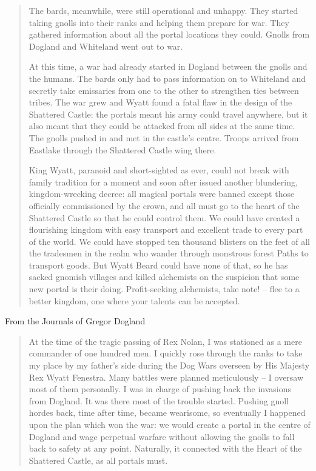 \begin{multicols}{2}
\begin{quotation}
	The bards, meanwhile, were still operational and unhappy.  They started taking gnolls into their ranks and helping them prepare for war.  They gathered information about all the portal locations they could.  Gnolls from Dogland and Whiteland went out to war.

	At this time, a war had already started in Dogland between the gnolls and the humans.  The bards only had to pass information on to Whiteland and secretly take emissaries from one to the other to strengthen ties between tribes.  The war grew and Wyatt found a fatal flaw in the design of the Shattered Castle: the portals meant his army could travel anywhere, but it also meant that they could be attacked from all sides at the same time.  The gnolls pushed in and met in the castle's centre.  Troops arrived from Eastlake through the Shattered Castle wing there.

	King Wyatt, paranoid and short-sighted as ever, could not break with family tradition for a moment and soon after issued another blundering, kingdom-wrecking decree: all magical portals were banned except those officially commissioned by the crown, and all must go to the heart of the Shattered Castle so that he could control them.  We could have created a flourishing kingdom with easy transport and excellent trade to every part of the world.  We could have stopped ten thousand blisters on the feet of all the tradesmen in the realm who wander through monstrous forest Paths to transport goods.  But Wyatt Beard could have none of that, so he has sacked gnomish villages and killed alchemists on the suspicion that some new portal is their doing.  Profit-seeking alchemists, take note! -- flee to a better kingdom, one where your talents can be accepted.

\end{quotation}

From the Journals of Gregor Dogland

\begin{quotation}

	At the time of the tragic passing of Rex Nolan, I was stationed as a mere commander of one hundred men.  I quickly rose through the ranks to take my place by my father's side during the Dog Wars overseen by His Majesty Rex Wyatt Fenestra.  Many battles were planned meticulously -- I oversaw most of them personally.  I was in charge of pushing back the invasions from Dogland.  It was there most of the trouble started.  Pushing gnoll hordes back, time after time, became wearisome, so eventually I happened upon the plan which won the war: we would create a portal in the centre of Dogland and wage perpetual warfare without allowing the gnolls to fall back to safety at any point.  Naturally, it connected with the Heart of the Shattered Castle, as all portals must.


\end{quotation}
\end{multicols}
